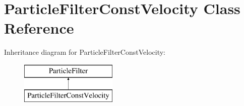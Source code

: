 \hypertarget{classParticleFilterConstVelocity}{}\section{Particle\+Filter\+Const\+Velocity Class Reference}
\label{classParticleFilterConstVelocity}
Inheritance diagram for Particle\+Filter\+Const\+Velocity\+:\begin{figure}[H]
\begin{center}
\leavevmode
\includegraphics[height=2.000000cm]{classParticleFilterConstVelocity}
\end{center}
\end{figure}

